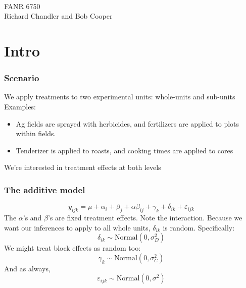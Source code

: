 \documentclass[color=usenames,dvipsnames]{beamer}\usepackage[]{graphicx}\usepackage[]{color}
\begin{document}
\begin{frame}[plain]
  \huge
  \centering \par
  {\color{RoyalBlue}{Lab 9 -- Split-plot Designs}} \\
  \vspace{1cm}
  \Large
  FANR 6750 \\
  \vfill
  \large
  Richard Chandler and Bob Cooper
\end{frame}





\section{Intro}





\begin{frame}
  \frametitle{Scenario}
  \large
  We apply treatments to two experimental units: whole-units and
  sub-units
  \pause
  \vfill
  Examples:
  \begin{itemize}
    \large
    \item Ag fields are sprayed with herbicides, and fertilizers
      are applied to plots within fields.
    \item Tenderizer is applied to roasts, and cooking times are
      applied to cores
  \end{itemize}
  \pause
  \vfill
  We're interested in treatment effects at both levels
\end{frame}






\begin{frame}
  \frametitle{The additive model}
\[
y_{ijk} = \mu + \alpha_i + \beta_{j} + \alpha\beta_{ij} + \gamma_k +
\delta_{ik} + \varepsilon_{ijk}
\] %
The $\alpha$'s and $\beta$'s are fixed treatment effects. Note the interaction.
\pause
\vfill
Because we want our inferences to apply to all whole units,
$\delta_{ik}$ is random. Specifically:
\[
\delta_{ik} \sim \mbox{Normal}(0, \sigma^2_D)
\]
We might treat block effects as random too:
\[
\gamma_k \sim \mbox{Normal}(0, \sigma^2_C)
\]
\large
And as always,
\[
\varepsilon_{ijk} \sim \mbox{Normal}(0, \sigma^2)
\]
\end{frame}
\end{document}
